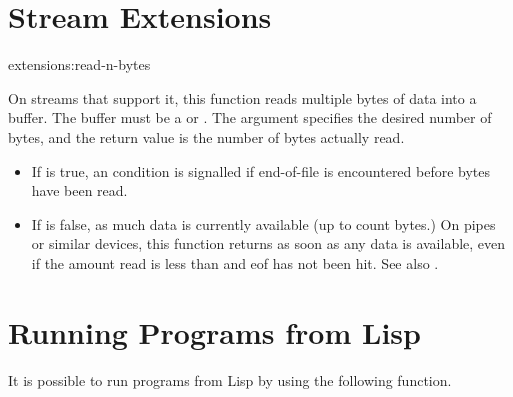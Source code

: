 \section{Stream Extensions}
\begin{defun}{extensions:}{read-n-bytes}{%
    }
  
  On streams that support it, this function reads multiple bytes of
  data into a buffer.  The buffer must be a  or
  .  The argument
   specifies the desired number of bytes, and the return
  value is the number of bytes actually read.
  \begin{itemize}
  \item If  is true, an 
    condition is signalled if end-of-file is encountered before
     bytes have been read.
    
  \item If  is false,  as
    much data is currently available (up to count bytes.)  On pipes or
    similar devices, this function returns as soon as any data is
    available, even if the amount read is less than  and
    eof has not been hit.  See also .
  \end{itemize}
\end{defun}



\section{Running Programs from Lisp}

It is possible to run programs from Lisp by using the following function.

